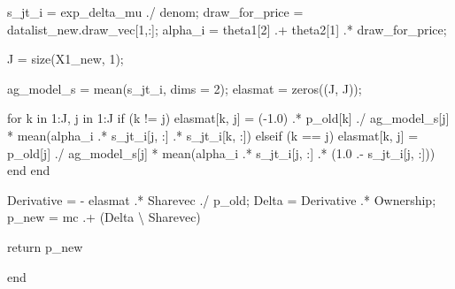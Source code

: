 \documentclass[
  letterpaper,
  DIV=11,
  numbers=noendperiod]{scrreprt}
\newenvironment{Shaded}{\begin{snugshade}}{\end{snugshade}}
\newcommand{\ControlFlowTok}[1]{\textcolor[rgb]{0.00,0.23,0.31}{#1}}
\newcommand{\FloatTok}[1]{\textcolor[rgb]{0.68,0.00,0.00}{#1}}
\newcommand{\FunctionTok}[1]{\textcolor[rgb]{0.28,0.35,0.67}{#1}}
\newcommand{\KeywordTok}[1]{\textcolor[rgb]{0.00,0.23,0.31}{#1}}
\newcommand{\NormalTok}[1]{\textcolor[rgb]{0.00,0.23,0.31}{#1}}
\newcommand{\OperatorTok}[1]{\textcolor[rgb]{0.37,0.37,0.37}{#1}}
\begin{document}
\begin{Shaded}
\begin{Highlighting}[]
\NormalTok{    s\_jt\_i }\OperatorTok{=}\NormalTok{ exp\_delta\_mu }\OperatorTok{./}\NormalTok{ denom;}
\NormalTok{    draw\_for\_price }\OperatorTok{=}\NormalTok{ datalist\_new.draw\_vec[}\FloatTok{1}\NormalTok{,}\OperatorTok{:}\NormalTok{];}
\NormalTok{    alpha\_i }\OperatorTok{=}\NormalTok{ theta1[}\FloatTok{2}\NormalTok{] }\OperatorTok{.+}\NormalTok{ theta2[}\FloatTok{1}\NormalTok{] }\OperatorTok{.*}\NormalTok{ draw\_for\_price;}
    
\NormalTok{    J }\OperatorTok{=} \FunctionTok{size}\NormalTok{(X1\_new, }\FloatTok{1}\NormalTok{);}
    
\NormalTok{    ag\_model\_s }\OperatorTok{=} \FunctionTok{mean}\NormalTok{(s\_jt\_i, dims }\OperatorTok{=} \FloatTok{2}\NormalTok{);}
\NormalTok{    elasmat }\OperatorTok{=} \FunctionTok{zeros}\NormalTok{((J, J));}

    \ControlFlowTok{for}\NormalTok{ k }\KeywordTok{in} \FloatTok{1}\OperatorTok{:}\NormalTok{J, j }\KeywordTok{in} \FloatTok{1}\OperatorTok{:}\NormalTok{J}
        \ControlFlowTok{if}\NormalTok{ (k }\OperatorTok{!=}\NormalTok{ j)}
\NormalTok{            elasmat[k, j] }\OperatorTok{=}\NormalTok{ (}\OperatorTok{{-}}\FloatTok{1.0}\NormalTok{) }\OperatorTok{.*}\NormalTok{ p\_old[k] }\OperatorTok{./}\NormalTok{ ag\_model\_s[j] }\OperatorTok{*} \FunctionTok{mean}\NormalTok{(alpha\_i }\OperatorTok{.*}\NormalTok{ s\_jt\_i[j, }\OperatorTok{:}\NormalTok{] }\OperatorTok{.*}\NormalTok{ s\_jt\_i[k, }\OperatorTok{:}\NormalTok{])}
        \ControlFlowTok{elseif}\NormalTok{ (k }\OperatorTok{==}\NormalTok{ j)}
\NormalTok{            elasmat[k, j] }\OperatorTok{=}\NormalTok{ p\_old[j] }\OperatorTok{./}\NormalTok{ ag\_model\_s[j] }\OperatorTok{*} \FunctionTok{mean}\NormalTok{(alpha\_i }\OperatorTok{.*}\NormalTok{ s\_jt\_i[j, }\OperatorTok{:}\NormalTok{] }\OperatorTok{.*}\NormalTok{ (}\FloatTok{1.0} \OperatorTok{.{-}}\NormalTok{ s\_jt\_i[j, }\OperatorTok{:}\NormalTok{]))}
        \ControlFlowTok{end}
    \ControlFlowTok{end}

\NormalTok{    Derivative }\OperatorTok{=} \OperatorTok{{-}}\NormalTok{ elasmat }\OperatorTok{.*}\NormalTok{ Sharevec}\OperatorTok{\textquotesingle{}} \OperatorTok{./}\NormalTok{ p\_old;}
\NormalTok{    Delta }\OperatorTok{=}\NormalTok{ Derivative }\OperatorTok{.*}\NormalTok{ Ownership;}
\NormalTok{    p\_new }\OperatorTok{=}\NormalTok{ mc }\OperatorTok{.+}\NormalTok{ (Delta }\OperatorTok{\textbackslash{}}\NormalTok{ Sharevec)}

    \ControlFlowTok{return}\NormalTok{ p\_new}
    
\KeywordTok{end}
\end{Highlighting}
\end{Shaded}
\end{document}
